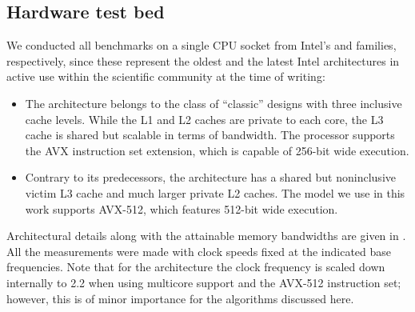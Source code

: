 \subsection{Hardware test bed}
We conducted all benchmarks on a single CPU socket from Intel's \IVB and  \SKX families, respectively, since these  represent the oldest and the latest Intel architectures in active use within the scientific community at the time of writing:
\begin{itemize}
\item The \Intel \IVB architecture belongs to the class of ``classic'' designs with three inclusive cache levels. While the L1 and L2 caches are private to each core, the L3 cache is shared but scalable in terms of bandwidth. The processor supports the AVX instruction set extension, which is capable of 256-bit wide \SIMD execution.
\item Contrary to its predecessors, the \Intel \SKX architecture has a shared but noninclusive victim L3 cache and much larger private L2 caches. The model we use in this work supports AVX-512, which features 512-bit wide \SIMD execution.
 
\end{itemize}
Architectural details along with the attainable memory bandwidths are given in . 
All the measurements were made with \CPU clock speeds fixed at the indicated base frequencies. Note that for the \SKX architecture the clock frequency is scaled down internally to 2.2 \GHZ when using multicore support and the AVX-512 instruction set; however, this is of minor importance for the algorithms discussed here.

